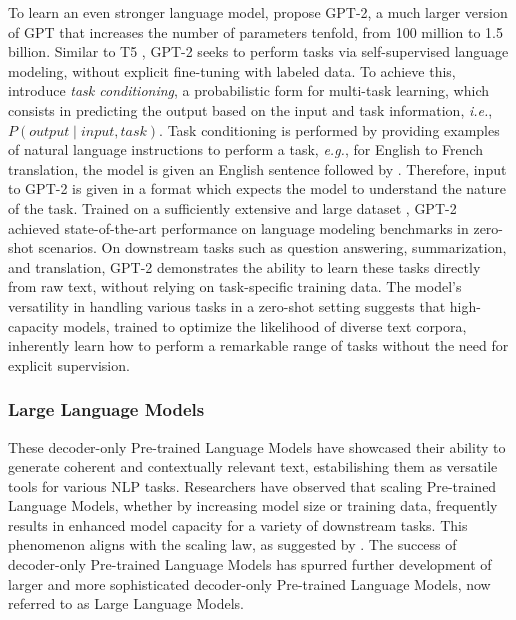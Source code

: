 To learn an even stronger language model, \citet{radford2019language} propose \ac{GPT}-2, a much larger version of \ac{GPT} that increases the number of parameters tenfold, from 100 million to 1.5 billion. Similar to T5 \citep{raffel2020exploring}, \ac{GPT}-2 seeks to perform tasks via self-supervised language modeling, without explicit fine-tuning with labeled data. To achieve this, \citet{radford2019language} introduce \textit{task conditioning}, a probabilistic form for multi-task learning, which consists in predicting the output based on the input and task information, \textit{i.e.}, $P(output \mid input, task)$. Task conditioning is performed by providing examples of natural language instructions to perform a task, \textit{e.g.}, for English to French translation, the model is given an English sentence followed by . Therefore, input to \ac{GPT}-2 is given in a format which expects the model to understand the nature of the task. Trained on a sufficiently extensive and large dataset \citep{radford2019language}, \ac{GPT}-2 achieved state-of-the-art performance on language modeling benchmarks \citep{marcus1993building, chelba2013one, merity2016pointer} in zero-shot scenarios. On downstream tasks such as question answering, summarization, and translation, \ac{GPT}-2 demonstrates the ability to learn these tasks directly from raw text, without relying on task-specific training data. The model's versatility in handling various tasks in a zero-shot setting suggests that high-capacity models, trained to optimize the likelihood of diverse text corpora, inherently learn how to perform a remarkable range of tasks without the need for explicit supervision.




\subsubsection{Large Language Models}

These decoder-only Pre-trained Language Models have showcased their ability to generate coherent and contextually relevant text, estabilishing them as versatile tools for various \ac{NLP} tasks. Researchers have observed that scaling Pre-trained Language Models, whether by increasing model size or training data, frequently results in enhanced model capacity for a variety of downstream tasks. This phenomenon aligns with the scaling law, as suggested by \citet{kaplan2020scaling}. The success of decoder-only Pre-trained Language Models has spurred further development of larger and more sophisticated decoder-only Pre-trained Language Models, now referred to as Large Language Models.

